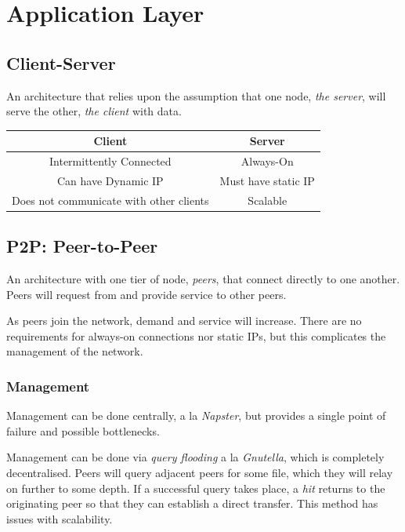 \documentclass{article}
\begin{document}
\newpage
\section{Application Layer}
\subsection{Client-Server}

An architecture that relies upon the assumption that one node, \textit{the server}, will serve the other, \textit{the client} with data.

\begin{center}
  \begin{tabular}{|c|c|}
    \hline
    \textbf{Client} & \textbf{Server}\\
    \hline\hline
    Intermittently Connected & Always-On\\
    \hline
    Can have Dynamic IP & Must have static IP\\
    \hline
    Does not communicate with other clients & Scalable\\
    \hline
  \end{tabular}
\end{center}

\subsection{P2P: Peer-to-Peer}

An architecture with one tier of node, \textit{peers}, that connect directly to one another. Peers will request from and provide service to other peers.

As peers join the network, demand and service will increase. There are no requirements for always-on connections nor static IPs, but this complicates the management of the network.

\subsubsection{Management}

Management can be done centrally, a la \textit{Napster}, but provides a single point of failure and possible bottlenecks.

Management can be done via \textit{query flooding} a la \textit{Gnutella}, which is completely decentralised. Peers will query adjacent peers for some file, which they will relay on further to some depth. If a successful query takes place, a \textit{hit} returns to the originating peer so that they can establish a direct transfer. This method has issues with scalability.
\end{document}
